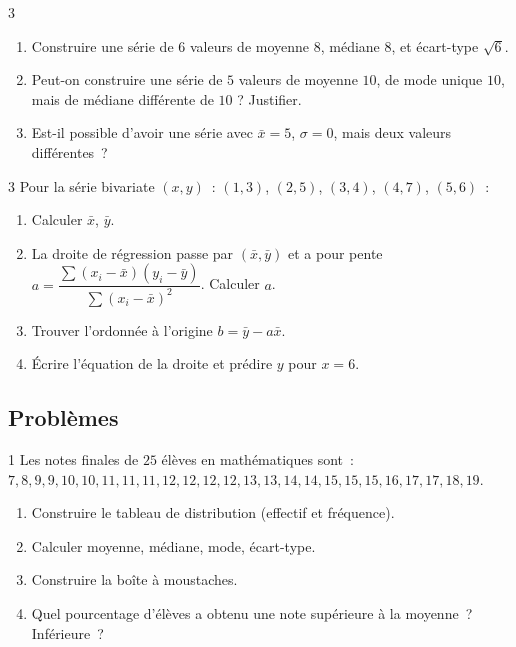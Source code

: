 \begin{exo}{3}
\begin{enumerate}
  \item Construire une s\'erie de $6$ valeurs de moyenne $8$,
        m\'ediane $8$, et \'ecart-type $\sqrt{6}$.
  \item Peut-on construire une s\'erie de $5$ valeurs de moyenne $10$,
        de mode unique $10$, mais de m\'ediane diff\'erente de $10$ ? Justifier.
  \item Est-il possible d'avoir une s\'erie avec $\bar{x}=5$,
        $\sigma=0$, mais deux valeurs diff\'erentes~?
\end{enumerate}
\end{exo}

\begin{exo}{3}
Pour la s\'erie bivariate $(x,y)$~: $(1,3)$, $(2,5)$, $(3,4)$, $(4,7)$, $(5,6)$~:
\begin{enumerate}
  \item Calculer $\bar{x}$, $\bar{y}$.
  \item La droite de r\'egression passe par $(\bar{x},\bar{y})$ et
        a pour pente $a=\dfrac{\sum(x_i-\bar{x})(y_i-\bar{y})}{\sum(x_i-\bar{x})^2}$.
        Calculer $a$.
  \item Trouver l'ordonnée \`a l'origine $b=\bar{y}-a\bar{x}$.
  \item \'Ecrire l'\'equation de la droite et pr\'edire $y$ pour $x=6$.
\end{enumerate}
\end{exo}

\subsection*{Probl\`emes}

\begin{probleme}{1}
Les notes finales de $25$ \'el\`eves en math\'ematiques sont~:
$7, 8, 9, 9, 10, 10, 11, 11, 11, 12, 12, 12, 12, 13, 13, 14, 14, 15, 15, 15, 16, 17, 17, 18, 19$.
\begin{enumerate}
  \item Construire le tableau de distribution (effectif et fr\'equence).
  \item Calculer moyenne, m\'ediane, mode, \'ecart-type.
  \item Construire la bo\^ite \`a moustaches.
  \item Quel pourcentage d'\'el\`eves a obtenu une note sup\'erieure
        \`a la moyenne~? Inf\'erieure~?
\end{enumerate}
\end{probleme}

